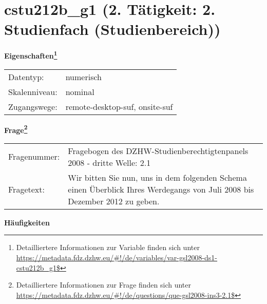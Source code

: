 
    \setcounter{footnote}{0}

    \vspace*{-1.8cm}
	\section{cstu212b\_g1 (2. Tätigkeit: 2. Studienfach (Studienbereich))}
	\label{section:cstu212b_g1}



    \vspace*{0.5cm}
    \noindent\textbf{Eigenschaften\footnote{Detailliertere Informationen zur Variable finden sich unter
		\url{https://metadata.fdz.dzhw.eu/\#!/de/variables/var-gsl2008-ds1-cstu212b_g1$}}}\\
	\begin{tabularx}{\hsize}{@{}lX}
	Datentyp: & numerisch \\
	Skalenniveau: & nominal \\
	Zugangswege: &
	  remote-desktop-suf, 
	  onsite-suf
 \\
    \end{tabularx}



				\vspace*{0.5cm}
                \noindent\textbf{Frage\footnote{Detailliertere Informationen zur Frage finden sich unter
		              \url{https://metadata.fdz.dzhw.eu/\#!/de/questions/que-gsl2008-ins3-2.1$}}}\\
				\begin{tabularx}{\hsize}{@{}lX}
					Fragenummer: &
					  Fragebogen des DZHW-Studienberechtigtenpanels 2008 - dritte Welle:
					  2.1
 \\
					Fragetext: & Wir bitten Sie nun, uns in dem folgenden Schema einen Überblick Ihres Werdegangs von Juli 2008 bis Dezember 2012 zu geben. \\
				\end{tabularx}





        		\vspace*{0.5cm}
                \noindent\textbf{Häufigkeiten}

